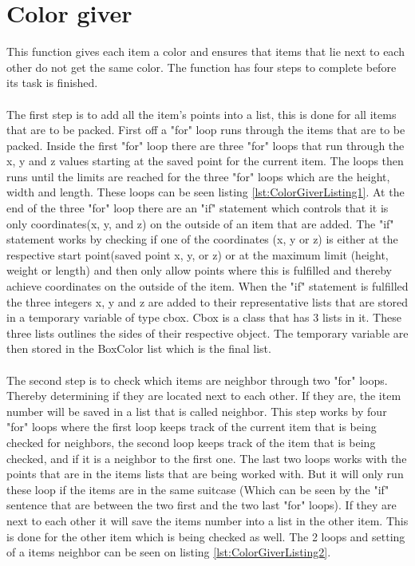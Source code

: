 \section{Color giver}
This function gives each item a color and ensures that items that lie next to each other do not get the same color. The function has four steps to complete before its task is finished.\\
\\
The first step is to add all the item's points into a list, this is done for all items that are to be packed. First off a "for" loop runs through the items that are to be packed. Inside the first "for" loop there are three "for" loops that run through the x, y and z values starting at the saved point for the current item. The loops then runs until the limits are reached for the three "for" loops which are the height, width and length. These loops can be seen listing \ref{lst:ColorGiverListing1}. At the end of the three "for" loop there are an "if" statement which controls that it is only coordinates(x, y, and z) on the outside of an item that are added. The "if" statement works by checking if one of the coordinates (x, y or z) is either at the respective start point(saved point x, y, or z) or at the maximum limit (height, weight or length) and then only allow points where this is fulfilled and thereby achieve coordinates on the outside of the item.
When the "if" statement is fulfilled the three integers x, y and z are added to their representative lists that are stored in a temporary variable of type cbox. Cbox is a class that has 3 lists in it. These three lists outlines the sides of their respective object. The temporary variable are then stored in the BoxColor list which is the final list.\\ 
\\
The second step is to check which items are neighbor through two "for" loops. Thereby determining if they are located next to each other. If they are, the item number will be saved in a list that is called neighbor. This step works by four "for" loops where the first loop keeps track of the current item that is being checked for neighbors, the second loop keeps track of the item that is being checked, and if it is a neighbor to the first one. The last two loops works with the points that are in the items lists that are being worked with. But it will only run these loop if the items are in the same suitcase (Which can be seen by the "if" sentence that are between the two first and the two last "for" loops). If they are next to each other it will save the items number into a list in the other item. This is done for the other item which is being checked as well. The 2 loops and setting of a items neighbor can be seen on listing \ref{lst:ColorGiverListing2}.\\
